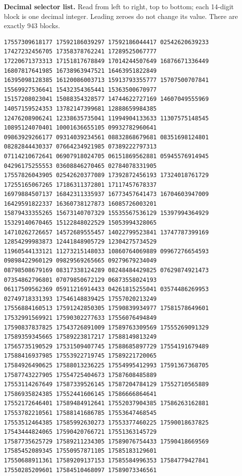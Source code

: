 \documentclass[9pt]{article}
\begin{document}
\textbf{Decimal selector list.} Read from left to right, top to bottom;
each 14-digit block is one decimal integer. Leading zeroes do not change its
value. There are exactly 943 blocks.
\begin{verbatim}
17557309618177 17592186039297 17592186044417 02542620639233 17427232456705 17358378762241 17289525067777
17220671373313 17151817678849 17014244507649 16876671336449 16807817641985 16738963947521 16463951822849
16395098128385 16120086003713 15913793355777 15707500707841 15569927536641 15432354365441 15363500670977
15157208023041 15088354328577 14744622727169 14607049555969 14057159524353 13782147399681 12888659984385
12476208906241 12338635735041 11994904133633 11307575148545 10895124070401 10001636655105 09932782960641
09863929266177 09314039234561 08832868679681 08351698124801 08282844430337 07664234921985 07389222797313
07114210672641 06907918024705 06151869562881 05945576914945 04296175255553 03608846270465 02784078331905
17557826043905 02542620377089 17392872456193 17324018761729 17255165067265 17186311372801 17117457678337
16979884507137 16842311335937 16773457641473 16704603947009 16429591822337 16360738127873 16085726003201
15879433355265 15673140707329 15535567536129 15397994364929 15329140670465 15122848022529 15053994328065
14710262726657 14572689555457 14022799523841 13747787399169 12854299983873 12441848905729 12304275734529
11960544133121 11273215148033 10860764069889 09967276654593 09898422960129 09829569265665 09279679234049
08798508679169 08317338124289 08248484429825 07629874921473 07354862796801 07079850672129 06873558024193
06117509562369 05911216914433 04261815255041 03574486269953 02749718331393 17546148839425 17557020213249
17556884160513 17591242850305 17590839934977 17581578649601 17532991569921 17590302277633 17556076494849
17590837837825 17543726891009 17589763309569 17555269091329 17589359345665 17589223817217 17588149813249
17565735190529 17531509407745 17588685897729 17554191679489 17588416937985 17553922719745 17589221720065
17584926490625 17588013236225 17554995412993 17591367368705 17587743227905 17554725404673 17587608485889
17553114267649 17587339526145 17587204784129 17552710565889 17586935824385 17552441606145 17586666864641
17552172646401 17589484912641 17552037904385 17586263162881 17553782210561 17588141686785 17553647468545
17553512464385 17585992630273 17553377460225 17590018637825 17543444824065 17590420766721 17551363145729
17587735625729 17589211234305 17589076754433 17590418669569 17585452089345 17550957871105 17585183129601
17550688911361 17589209137153 17585584996353 17584779427841 17550285209601 17584510468097 17589073346561

\end{verbatim}
\end{document}
